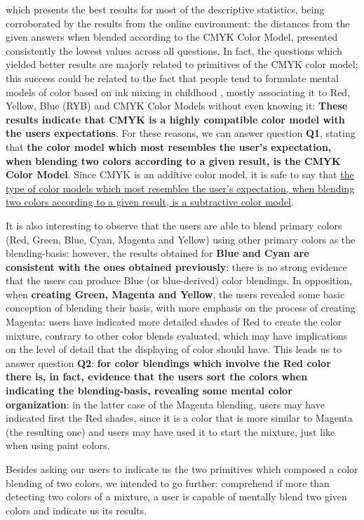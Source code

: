 which presents the best results for most of the descriptive statistics, being corroborated by the results from the online environment: the distances from the given answers when blended according to the CMYK Color Model, presented consistently the lowest values across
all questions. In fact, the questions which yielded better results are majorly related to primitives of the CMYK color model; this success could be related to the fact that people tend to formulate mental models of color based on ink mixing in childhood
\cite{Gossett2004}, mostly associating it to Red, Yellow, Blue (RYB) and CMYK Color Models without even knowing it: \textbf{These results indicate that CMYK is a highly compatible color model with the users expectations}. For these reasons, we can answer question
\textbf{Q1}, stating that \textbf{the color model which most resembles the user's expectation, when blending two colors according to a given result, is the CMYK Color Model}. Since CMYK is an additive color model, it is safe to say that \ul{the type of color models which
most resembles the user's expectation, when blending two colors according to a given result, is a subtractive color model}. \par
%
It is also interesting to observe that the users are able to blend primary colors (Red, Green, Blue, Cyan, Magenta and Yellow) using other primary colors as the blending-basis: however, the results obtained for \textbf{Blue and Cyan are consistent with the ones
obtained previously}: there is no strong evidence that the users can produce Blue (or blue-derived) color blendings. In opposition, when \textbf{creating Green, Magenta and Yellow}, the users revealed some basic conception of blending their basis, with more emphasis
on the process of creating Magenta: users have indicated more detailed shades of Red to create the color mixture, contrary to other color blends evaluated, which may have implications on the level of detail that the displaying of color should have. This leads us to
answer question \textbf{Q2}: \textbf{for color blendings which involve the Red color there is, in fact, evidence that the users sort the colors when indicating the blending-basis, revealing some mental color organization}: in the latter case of the Magenta blending, users may have indicated
first the Red shades, since it is a color that is more similar to Magenta (the resulting one) and users may have used it to start the mixture, just like when using paint colors. \par
%
Besides asking our users to indicate us the two primitives which composed a color blending of two colors, we intended to go further: comprehend if more than detecting two colors of a mixture, a user is capable of mentally blend two given colors and indicate us its results.
